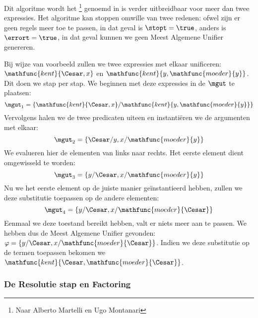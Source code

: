 Dit algoritme wordt het \footnote{Naar Alberto Martelli en Ugo Montanari} genoemd in is verder uitbreidbaar voor meer dan twee expressies. Het algoritme kan stoppen omwille van twee redenen: ofwel zijn er geen regels meer toe te passen, in dat geval is $\stopt=\true$, anders is $\errort=\true$, in dat geval kunnen we geen Meest Algemene Unifier genereren.
\begin{leftbar}
Bij wijze van voorbeeld zullen we twee expressies met elkaar unificeren: $\mathfunc{kent}{\Cesar,x}$ en $\mathfunc{kent}{y,\mathfunc{moeder}{y}}$. Dit doen we stap per stap. We beginnen met deze expressies in de $\mgut$ te plaatsen:
\begin{equation}
\mgut_1=\left\{\mathfunc{kent}{\Cesar,x}/\mathfunc{kent}{y,\mathfunc{moeder}{y}}\right\}
\end{equation}
Vervolgens halen we de twee predicaten uiteen en instantiëren we de argumenten met elkaar:
\begin{equation}
\mgut_2=\left\{\Cesar/y,x/\mathfunc{moeder}{y}\right\}
\end{equation}
We evalueren hier de elementen van links naar rechts. Het eerste element dient omgewisseld te worden:
\begin{equation}
\mgut_3=\left\{y/\Cesar,x/\mathfunc{moeder}{y}\right\}
\end{equation}
Nu we het eerste element op de juiste manier geïnstantieerd hebben, zullen we deze substitutie toepassen op de andere elementen:
\begin{equation}
\mgut_4=\left\{y/\Cesar,x/\mathfunc{moeder}{\Cesar}\right\}
\end{equation}
Eenmaal we deze toestand bereikt hebben, valt er niets meer aan te passen. We hebben dus de Meest Algemene Unifier gevonden: $\varphi=\left\{y/\Cesar,x/\mathfunc{moeder}{\Cesar}\right\}$. Indien we deze substitutie op de termen toepassen bekomen we $\mathfunc{kent}{\Cesar,\mathfunc{moeder}{\Cesar}}$.
\end{leftbar}
\subsubsection{De Resolutie stap en Factoring}
\label{sss:resolutionStep}
